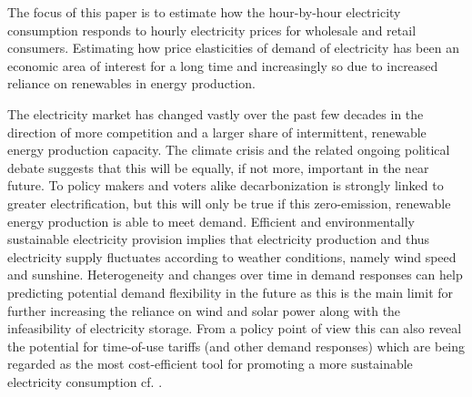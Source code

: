 \label{sec:intro}
The focus of this paper is to estimate how the hour-by-hour electricity consumption responds to hourly electricity prices for wholesale and retail consumers. Estimating how price elasticities of demand of electricity has been an economic area of interest for a long time and increasingly so due to increased reliance on renewables in energy production.
\medskip

The electricity market has changed vastly over the past few decades in the direction of more competition and a larger share of intermittent, renewable energy production capacity. The climate crisis and the related ongoing political debate suggests that this will be equally, if not more, important in the near future. To policy makers and voters alike decarbonization is strongly linked to greater electrification, but this will only be true if this zero-emission, renewable energy production is able to meet demand.  Efficient and environmentally sustainable electricity provision implies that electricity production and thus electricity supply fluctuates according to weather conditions, namely wind speed and sunshine. Heterogeneity and changes over time in demand responses can help predicting potential demand flexibility in the future as this is the main limit for further increasing the reliance on wind and solar power along with the infeasibility of electricity storage. From a policy point of view this can also reveal the potential for time-of-use tariffs (and other demand responses) which are being regarded as the most cost-efficient tool for promoting a more sustainable electricity consumption cf. \citet{albadi2008summary}.
\medskip

